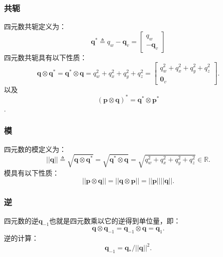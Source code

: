 \documentclass[10pt, a4paper]{article}
\begin{document}
  \subsubsection{共轭}
  四元数共轭定义为：
  \begin{equation} \label{eq-24}
    \mathbf{q}^{*} \triangleq q_w - \mathbf{q}_v =
    \begin{bmatrix}
      q_w \\ -\mathbf{q}_v
    \end{bmatrix}
  \end{equation}
  四元数共轭具有以下性质：
  \begin{equation} \label{eq-25}
    \mathbf{q} \otimes \mathbf{q}^{*} = \mathbf{q}^{*} \otimes \mathbf{q} = q_w^2 + q_x^2 + q_y^2 + q_z^2 =
    \begin{bmatrix}
      q_w^2 + q_x^2 + q_y^2 + q_z^2 \\ \mathbf{0}_v
    \end{bmatrix}.
  \end{equation}
  以及
  \begin{equation} \label{eq-26}
    (\mathbf{p} \otimes \mathbf{q})^{*} = \mathbf{q}^{*} \otimes \mathbf{p}^{*}
  \end{equation}.

  \subsubsection{模}
  四元数的模定义为：
  \begin{equation} \label{eq-27}
    || \mathbf{q} || \triangleq \sqrt{\mathbf{q} \otimes \mathbf{q}^*} =
    \sqrt{\mathbf{q}^* \otimes \mathbf{q}} = \sqrt{q_w^2 + q_x^2 + q_y^2 + q_z^2} \in \mathbb{R} .
  \end{equation}
  模具有以下性质：
  \begin{equation} \label{eq-28}
    || \mathbf{p} \otimes \mathbf{q} || = || \mathbf{q} \otimes \mathbf{p} || = ||\mathbf{p}|| ||\mathbf{q}||.
  \end{equation}

  \subsubsection{逆}
  四元数的逆$\mathbf{q}_{-1}$也就是四元数乘以它的逆得到单位量，即：
  \begin{equation} \label{eq-29}
    \mathbf{q} \otimes \mathbf{q}_{-1} = \mathbf{q}_{-1} \otimes \mathbf{q} = \mathbf{q}_1 .
  \end{equation}
  逆的计算：
  \begin{equation} \label{eq-30}
    \mathbf{q}_{-1} = \mathbf{q}_{*} / ||\mathbf{q}||^2 .
  \end{equation}
\end{document}
